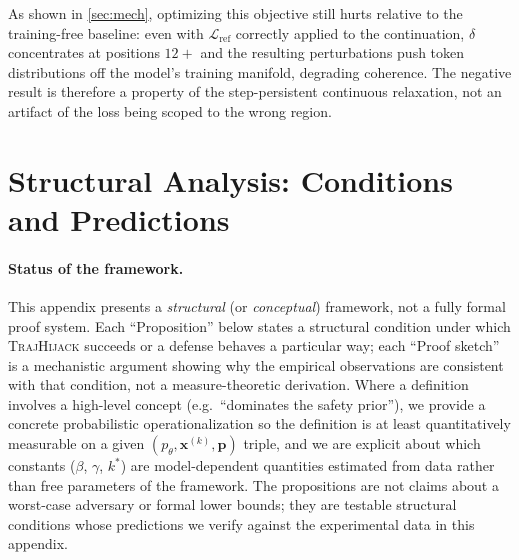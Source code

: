 \documentclass{article}
\theoremstyle{coloredthm}
\newcommand{\method}{\textsc{TrajHijack}}
\begin{document}
As shown in \cref{sec:mech}, optimizing this objective still hurts relative to the training-free baseline: even with $\mathcal{L}_{\text{ref}}$ correctly applied to the continuation, $\delta$ concentrates at positions $12+$ and the resulting perturbations push token distributions off the model's training manifold, degrading coherence. The negative result is therefore a property of the step-persistent continuous relaxation, not an artifact of the loss being scoped to the wrong region.

\section{Structural Analysis: Conditions and Predictions}
\label{sec:formal_appendix}

\paragraph{Status of the framework.} This appendix presents a \emph{structural} (or \emph{conceptual}) framework, not a fully formal proof system. Each ``Proposition'' below states a structural condition under which \method{} succeeds or a defense behaves a particular way; each ``Proof sketch'' is a mechanistic argument showing why the empirical observations are consistent with that condition, not a measure-theoretic derivation. Where a definition involves a high-level concept (e.g.\ ``dominates the safety prior''), we provide a concrete probabilistic operationalization so the definition is at least quantitatively measurable on a given $(p_\theta, \mathbf{x}^{(k)}, \mathbf{p})$ triple, and we are explicit about which constants ($\beta$, $\gamma$, $k^*$) are model-dependent quantities estimated from data rather than free parameters of the framework. The propositions are not claims about a worst-case adversary or formal lower bounds; they are testable structural conditions whose predictions we verify against the experimental data in this appendix.
\end{document}
